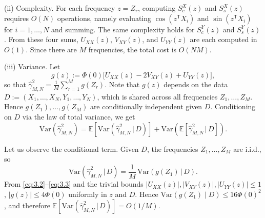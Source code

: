 \documentclass[11pt,leqno]{article}
\theoremstyle{plain}
\theoremstyle{remark}
\theoremstyle{definition}
\numberwithin{equation}{section}
\numberwithin{figure}{section}
\numberwithin{table}{section}
\numberwithin{algorithm}{section}
\newcommand{\EE}{\mathbb{E}}
\begin{document}
\noindent
(ii) Complexity.
For each frequency $z=Z_r$, computing $S_c^X(z)$ and $S_s^X(z)$ requires $O(N)$ operations,
namely evaluating $\cos(z^{\mathsf{T}}X_i)$ and $\sin(z^{\mathsf{T}}X_i)$ for $i=1,\ldots,N$ and summing.
The same complexity holds for $S_c^Y(z)$ and $S_s^Y(z)$.
From these four sums, $U_{XX}(z)$, $V_{XY}(z)$, and $U_{YY}(z)$ are each computed in $O(1)$.
Since there are $M$ frequencies, the total cost is $O(NM)$.

\medskip\noindent
(iii) Variance.
Let
\[
 g(z) := \Phi(0)\bigl[U_{XX}(z) - 2V_{XY}(z) + U_{YY}(z)\bigr],
\]
so that $\hat{\gamma}_{M,N}^2 = \frac{1}{M}\sum_{r=1}^M g(Z_r)$.
Note that $g(z)$ depends on the data $D := (X_1,\ldots,X_N,Y_1,\ldots,Y_N)$,
which is shared across all frequencies $Z_1,\ldots,Z_M$.
Hence $g(Z_1),\ldots,g(Z_M)$ are conditionally independent given $D$.
Conditioning on $D$ via the law of total variance, we get 
\begin{equation}\label{eq:6.2}
 \mathrm{Var}(\hat{\gamma}_{M,N}^2)
 = \EE\!\left[\mathrm{Var}\!\left(\hat{\gamma}_{M,N}^2 \,|\, D\right)\right]
 + \mathrm{Var}\!\left(\EE\!\left[\hat{\gamma}_{M,N}^2 \,|\, D\right]\right).
\end{equation}

Let us observe the conditional term.
Given $D$, the frequencies $Z_1,\ldots,Z_M$ are i.i.d., so
\[
 \mathrm{Var}(\hat{\gamma}_{M,N}^2\,|\, D) = \frac{1}{M}\,\mathrm{Var}(g(Z_1)\,|\, D).
\]
From \eqref{eq:3.2}--\eqref{eq:3.3} and the trivial bounds $|U_{XX}(z)|, |V_{XY}(z)|, |U_{YY}(z)| \le 1$,
$|g(z)|\le 4\Phi(0)$ uniformly in $z$ and $D$.
Hence $\mathrm{Var}(g(Z_1) \mid D) \le 16\Phi(0)^2$, and therefore
$\EE[\mathrm{Var}(\hat{\gamma}_{M,N}^2\,|\, D)] = O(1/M)$.
\end{document}
